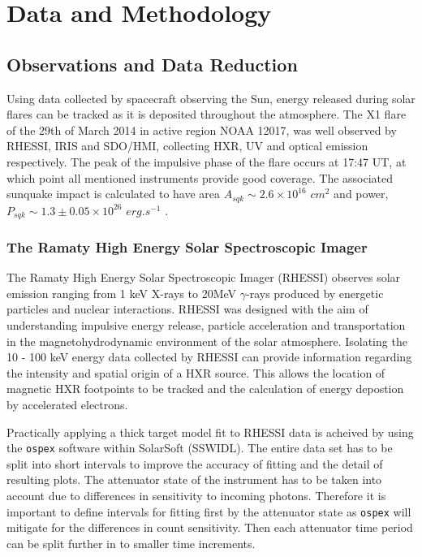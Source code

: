 \section{Data and Methodology}
\subsection{Observations and Data Reduction}
Using data collected by spacecraft observing the Sun, energy released during solar flares can be tracked as it is deposited throughout the atmosphere. The X1 flare of the 29th of March 2014 in active region NOAA 12017, was well observed by RHESSI, IRIS and SDO/HMI, collecting HXR, UV and optical emission respectively. The peak of the impulsive phase of the flare occurs at 17:47 UT, at which point all mentioned instruments provide good coverage. The associated sunquake impact is calculated to have area $A_{sqk} \sim 2.6{\times}10^{16}$ $cm^{2}$ and power, $P_{sqk} \sim 1.3\pm0.05{\times}10^{26}$ $erg.s^{-1}$ \citep{2014ApJ...796...85J}.

\subsubsection{The Ramaty High Energy Solar Spectroscopic Imager}\label{rhessi}
The Ramaty High Energy Solar Spectroscopic Imager (RHESSI) observes solar emission ranging from 1 keV X-rays to 20MeV $\gamma$-rays produced by energetic particles and nuclear interactions. RHESSI was designed with the aim of understanding impulsive energy release, particle acceleration and transportation in the magnetohydrodynamic environment of the solar atmosphere. Isolating the 10 - 100 keV energy data collected by RHESSI can provide information regarding the intensity and spatial origin of a HXR source. This allows the location of magnetic HXR footpoints to be tracked and the calculation of energy depostion by accelerated electrons. 
  
Practically applying a thick target model fit to RHESSI data is acheived by using the \texttt{ospex} software within SolarSoft (SSWIDL). The entire data set has to be split into short intervals to improve the accuracy of fitting and the detail of resulting plots. The attenuator state of the instrument has to be taken into account due to differences in sensitivity to incoming photons. Therefore it is important to define intervals for fitting first by the attenuator state as \texttt{ospex} will mitigate for the differences in count sensitivity. Then each attenuator time period can be split further in to smaller time increments. 


